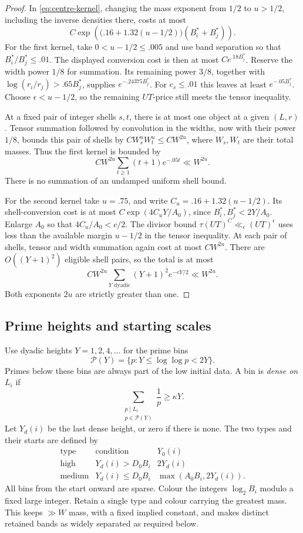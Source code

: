 \begin{proof}
In \eqref{eq:centre-kernel}, changing the mass exponent from $1/2$
to $u>1/2$, including the inverse densities there, costs at most
\[
 C\exp\left(
  \bigl(.16+1.32(u-1/2)\bigr)(B_i^*+B_j^*)\right).
\]
For the first kernel, take $0<u-1/2\le .005$ and use band
separation so that $B_i^*/B_j^*\le .01$. The displayed conversion
cost is then at most $Ce^{.18B_j^*}$. Reserve the width power
$1/8$ for summation. Its remaining power $3/8$, together with
$\log(r_i/r_j)>.65B_j^*$, supplies
$e^{-.24375B_j^*}$. For $c_s\le .01$ this leaves at least
$e^{-.05B_j^*}$. Choose $\epsilon<u-1/2$, so the remaining
$UT$-price still meets the tensor inequality.

At a fixed pair of integer shells $s,t$, there is at most one
object at a given $(L,r)$. Tensor summation followed by convolution
in the widths, now with their power $1/8$, bounds this pair of
shells by $CW_s^uW_t^u\le CW^{2u}$, where $W_s,W_t$ are their
total masses. Thus the first kernel is bounded by
\[
 CW^{2u}\sum_{t\ge1}(t+1)e^{-.05t}\ll W^{2u}.
\]
There is no summation of an undamped uniform shell bound.

For the second kernel take $u=.75$, and write
$C_u=.16+1.32(u-1/2)$. Its shell-conversion cost is at most
$C\exp(4C_uY/A_0)$, since $B_i^*,B_j^*<2Y/A_0$.
Enlarge $A_0$ so that $4C_u/A_0<c/2$. The divisor bound
$\tau(UT)^C\ll_\epsilon(UT)^\epsilon$ uses less than the
available margin $u-1/2$ in the tensor inequality. At each pair
of shells, tensor and width summation again cost at most $CW^{2u}$.
There are $O((Y+1)^2)$ eligible shell pairs, so the total is at most
\[
 CW^{2u}\sum_{Y\text{ dyadic}}(Y+1)^2e^{-cY/2}
 \ll W^{2u}.
\]
Both exponents $2u$ are strictly greater than one.
\end{proof}

\subsection{Prime heights and starting scales}
\label{cen:height-starts}

Use dyadic heights $Y=1,2,4,\ldots$ for the prime bins
\[
 \mathcal P(Y)=\{p:Y\le\log\log p<2Y\}.
\]
Primes below these bins are always part of the low initial data.
A bin is \emph{dense on $L_i$} if
\[
 \sum_{\substack{p\mid L_i\\p\in\mathcal P(Y)}}\frac1p
 \ge\kappa Y.
\]
Let $Y_d(i)$ be the last dense height, or zero if there is none.
The two types and their starts are defined by
\[
 \begin{array}{c|c|c}
 \text{type}&\text{condition}&Y_0(i)\\ \hline
 \text{high}&Y_d(i)>D_0B_i&2Y_d(i)\\
 \text{medium}&Y_d(i)\le D_0B_i&\max(A_0B_i,2Y_d(i)).
 \end{array}
\]
All bins from the start onward are sparse. Colour the integers
$\log_2B_i$ modulo a fixed large integer. Retain a single type and
colour carrying the greatest mass. This keeps $\gg W$ mass, with a
fixed implied constant, and makes distinct retained bands as widely
separated as required below.

